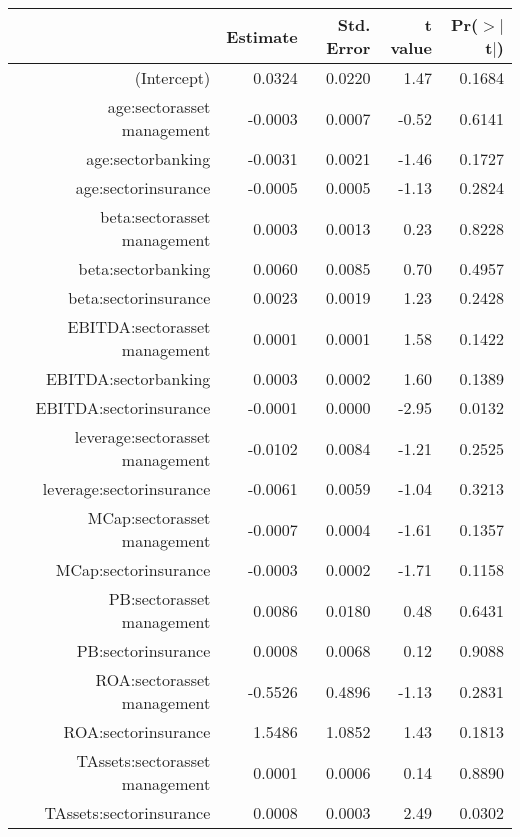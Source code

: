 \begin{table}[ht]
\centering
\begin{tabular}{rrrrr}
  \hline
 & Estimate & Std. Error & t value & Pr($>$$|$t$|$) \\ 
  \hline
(Intercept) & 0.0324 & 0.0220 & 1.47 & 0.1684 \\ 
  age:sectorasset management & -0.0003 & 0.0007 & -0.52 & 0.6141 \\ 
  age:sectorbanking & -0.0031 & 0.0021 & -1.46 & 0.1727 \\ 
  age:sectorinsurance & -0.0005 & 0.0005 & -1.13 & 0.2824 \\ 
  beta:sectorasset management & 0.0003 & 0.0013 & 0.23 & 0.8228 \\ 
  beta:sectorbanking & 0.0060 & 0.0085 & 0.70 & 0.4957 \\ 
  beta:sectorinsurance & 0.0023 & 0.0019 & 1.23 & 0.2428 \\ 
  EBITDA:sectorasset management & 0.0001 & 0.0001 & 1.58 & 0.1422 \\ 
  EBITDA:sectorbanking & 0.0003 & 0.0002 & 1.60 & 0.1389 \\ 
  EBITDA:sectorinsurance & -0.0001 & 0.0000 & -2.95 & 0.0132 \\ 
  leverage:sectorasset management & -0.0102 & 0.0084 & -1.21 & 0.2525 \\ 
  leverage:sectorinsurance & -0.0061 & 0.0059 & -1.04 & 0.3213 \\ 
  MCap:sectorasset management & -0.0007 & 0.0004 & -1.61 & 0.1357 \\ 
  MCap:sectorinsurance & -0.0003 & 0.0002 & -1.71 & 0.1158 \\ 
  PB:sectorasset management & 0.0086 & 0.0180 & 0.48 & 0.6431 \\ 
  PB:sectorinsurance & 0.0008 & 0.0068 & 0.12 & 0.9088 \\ 
  ROA:sectorasset management & -0.5526 & 0.4896 & -1.13 & 0.2831 \\ 
  ROA:sectorinsurance & 1.5486 & 1.0852 & 1.43 & 0.1813 \\ 
  TAssets:sectorasset management & 0.0001 & 0.0006 & 0.14 & 0.8890 \\ 
  TAssets:sectorinsurance & 0.0008 & 0.0003 & 2.49 & 0.0302 \\ 
   \hline
\end{tabular}
\end{table}
